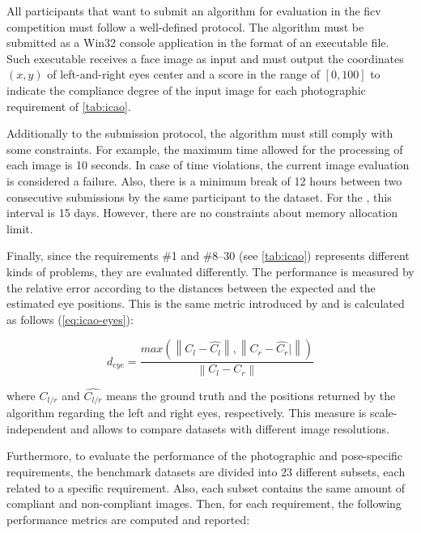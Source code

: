 All participants that want to submit an algorithm for evaluation in the \acs{ficv} competition must follow a well-defined protocol. The algorithm must be submitted as a Win32 console application in the format of an executable file. Such executable receives a face image as input and must output the coordinates $(x, y)$ of left-and-right eyes center and a score in the range of $[0, 100]$ to indicate the compliance degree of the input image for each photographic requirement of \autoref{tab:icao}.

Additionally to the submission protocol, the algorithm must still comply with some constraints. For example, the maximum time allowed for the processing of each image is 10 seconds. In case of time violations, the current image evaluation is considered a failure. Also, there is a minimum break of 12 hours between two consecutive submissions by the same participant to the \ficvtest dataset. For the \ficvofficial, this interval is 15 days. However, there are no constraints about memory allocation limit.

Finally, since the requirements \#1 and \#8--30 (see \autoref{tab:icao}) represents different kinds of problems, they are evaluated differently. The \citeReq{\eyecenterlocation} performance is measured by the relative error according to the distances between the expected and the estimated eye positions. This is the same metric introduced by \cite{jesorsky2001robust} and is calculated as follows (\autoref{eq:icao-eyes}):

\begin{equation}
\label{eq:icao-eyes}
d_{eye} = \frac{max(\left\| C_l - \hat{C_l} \right\|, \left\| C_r -\hat{C_r}|\right\|)}{\left\| C_l - C_r \right\|}
\end{equation}

\noindent
where $C_{l/r}$ and $\hat{C_{l/r}}$ means the ground truth and the positions returned by the algorithm regarding the left and right eyes, respectively. This measure is scale-independent and allows to compare datasets with different image resolutions.

Furthermore, to evaluate the performance of the photographic and pose-specific requirements, the benchmark datasets are divided into 23 different subsets, each related to a specific requirement. Also, each subset contains the same amount of compliant and non-compliant images. Then, for each requirement, the following performance metrics are computed and reported:

